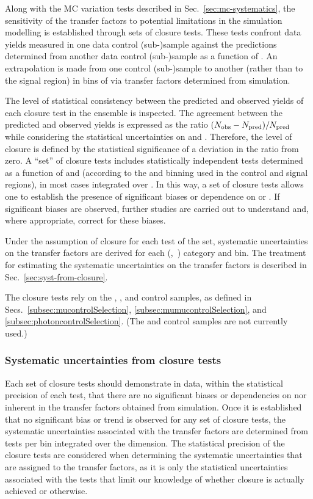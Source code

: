 Along with the MC variation tests described in Sec.~\ref{sec:mc-systematics}, 
the sensitivity of the transfer factors to potential limitations in
the simulation modelling is established through sets of closure tests.
These tests confront data yields measured in one data control (sub-)sample
against the predictions determined from another data control
(sub-)sample as a function of \scalht. An extrapolation is made
from one control (sub-)sample to another (rather than to the signal
region) in bins of \scalht via transfer factors determined from
simulation. 

The level of statistical consistency between the predicted and
observed yields of each closure test in the ensemble is inspected. The
agreement between the predicted and observed yields is
expressed as the ratio $(\nobs - \npre)/\npre$ while considering 
the statistical uncertainties on \npre and \nobs. Therefore, the level
of closure is defined by the statistical significance of a deviation
in the ratio from zero. A ``set'' of closure tests includes
statistically independent tests determined as a function of \scalht
and \njet (according to the \scalht and \njet binning used in the control and signal
regions), in most cases integrated over \nb. In this way, a set of closure 
tests allows one to establish
the presence of significant biases or dependence on
\scalht or \njet. If significant biases are
observed, further studies are carried out to understand and, where
appropriate, correct for
these biases. 

Under the assumption of closure for each test of the set,
systematic uncertainties on the transfer factors are derived for each
(\njet,~\nb) category and \scalht bin. The treatment for estimating
the systematic uncertainties on the transfer factors is described in
Sec.~\ref{sec:syst-from-closure}.

The closure tests rely on the \mj, \mmj, and \gj control samples,
as defined in Secs.~\ref{subsec:mucontrolSelection},
\ref{subsec:mumucontrolSelection}, and
\ref{subsec:photoncontrolSelection}. (The \ej and \eej control samples
are not currently used.)

\subsubsection{Systematic uncertainties from closure tests\label{sec:syst-from-closure}}

Each set of closure tests should demonstrate in data, within the
statistical precision of each test, that there are no significant
biases or dependencies on \njet nor \scalht inherent in the transfer
factors obtained from simulation. 
Once it is established that no significant bias or trend is observed
for any set of closure tests, the systematic uncertainties associated
with the transfer factors are determined from tests per \scalht bin
integrated over the \njet dimension. The statistical precision of the 
closure tests are considered
when determining the systematic uncertainties that are assigned to the
transfer factors, as it is only the statistical uncertainties
associated with the tests that limit our knowledge of whether closure
is actually achieved or otherwise. 

